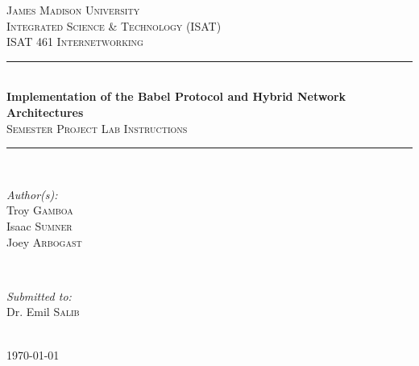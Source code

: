 \documentclass[main.tex]{subfiles}
\begin{document}
\begin{titlepage}

\newcommand{\HRule}{\rule{\linewidth}{0.5mm}} %
\center %

\textsc{\LARGE James Madison University}\\[1.0cm] %
\textsc{\Large Integrated Science \& Technology (ISAT)}\\[0.5cm] %
\textsc{\large ISAT 461 Internetworking}\\[0.5cm] %

\HRule \\[0.5cm]
{ \Large \bfseries Implementation of the Babel Protocol and Hybrid Network Architectures }\\[0.4cm] %
\textsc{\large Semester Project Lab Instructions}\\[0.4cm]
\HRule \\[.5cm]

\begin{minipage}{0.4\textwidth}
\begin{flushleft} \large
\emph{Author(s):}\\
Troy \textsc{Gamboa}\\ %
Isaac \textsc{Sumner}\\
Joey \textsc{Arbogast}\\
\end{flushleft}
\end{minipage}
~
\begin{minipage}{0.4\textwidth}
\begin{flushright} \large
\emph{Submitted to:} \\
Dr. Emil \textsc{Salib} %
\end{flushright}
\end{minipage}\\[0.5cm]

{\large \today}\\[0.5cm] %


\end{titlepage}
\end{document}
